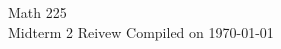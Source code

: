 \documentclass[11pt, letterpaper]{article}
\begin{document}
  \begin{titlepage}
    {\LARGE Math 225} \\ 
    {\large Midterm 2 Reivew}
    \vfill 
    Compiled on \today
  \end{titlepage}
  
  \begin{multicols}{3}
    
    
    
    
    
  \end{multicols}
\end{document}
